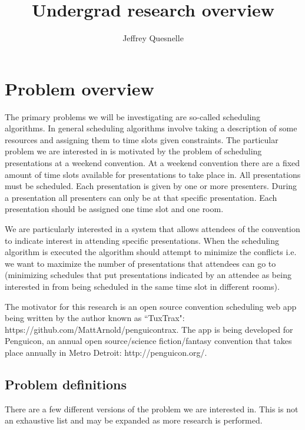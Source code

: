 \documentclass[]{article}
\title{Undergrad research overview}
\author{Jeffrey Quesnelle}
\theoremstyle{definition}
\theoremstyle{remark}
\numberwithin{equation}{section}
\begin{document}
\maketitle

\section{Problem overview}
The primary problems we will be investigating are so-called scheduling algorithms. In general scheduling algorithms involve taking a description of some resources and assigning them to time slots given constraints. The particular problem we are interested in is motivated by the problem of scheduling presentations at a weekend convention. At a weekend convention there are a fixed amount of time slots available for presentations to take place in. All presentations must be scheduled. Each presentation is given by one or more presenters. During a presentation all presenters can only be at that specific presentation. Each presentation should be assigned one time slot and one room.

We are particularly interested in a system that allows attendees of the convention to indicate interest in attending specific presentations. When the scheduling algorithm is executed the algorithm should attempt to minimize the conflicts i.e. we want to maximize the number of presentations that attendees can go to (minimizing schedules that put presentations indicated by an attendee as being interested in from being scheduled in the same time slot in different rooms).

The motivator for this research is an open source convention scheduling web app being written by the author known as ``TuxTrax": https://github.com/MattArnold/penguicontrax. The app is being developed for Penguicon, an annual open source/science fiction/fantasy convention that takes place annually in Metro Detroit: http://penguicon.org/. 

\subsection{Problem definitions}

There are a few different versions of the problem we are interested in. This is not an exhaustive list and may be expanded as more research is performed.
\end{document}
